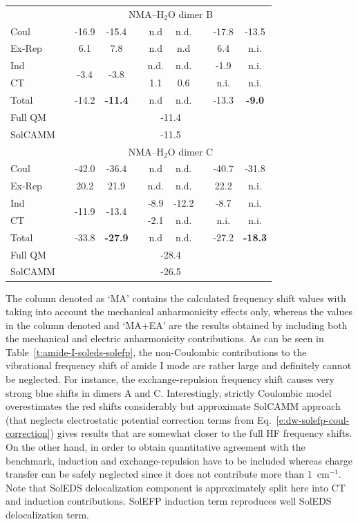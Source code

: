 \documentclass[b5paper,oneside,fleqn,11pt]{book}
\begin{document}
\begin{refsection}
\begin{table}[t!]
\begin{tabular*}{1.0\textwidth}{@{\extracolsep{\fill} } l ccccccccc }
%
 && \multicolumn{8}{c}{NMA--H$_2$O dimer B} \\
\cline{3-10}
Coul   &&  -16.9 & -15.4 && n.d   &  n.d. && -17.8 & -13.5 \\
Ex-Rep &&   6.1  &   7.8 && n.d   &  n.d  &&  6.4 &  n.i. \\
Ind    &&  \multirow{2}{*}{-3.4} & \multirow{2}{*}{-3.8} && n.d. & n.d. && -1.9 & n.i. \\
CT     &&       &       &&  1.1  &  0.6   &&   n.i.&  n.i. \\
Total  && -14.2 & \bf{-11.4} &&  n.d  &  n.d.  && -13.3 & \bf{-9.0} \\
Full QM&& \multicolumn{8}{c}{-11.4} \\
SolCAMM&& \multicolumn{8}{c}{-11.5} \\
%
 && \multicolumn{8}{c}{NMA--H$_2$O dimer C} \\
\cline{3-10}
Coul   && -42.0 & -36.4 &&   n.d  &  n.d. && -40.7 & -31.8 \\
Ex-Rep &&  20.2 &  21.9 &&   n.d. &  n.d. &&  22.2 &  n.i. \\
Ind    &&  \multirow{2}{*}{-11.9} & \multirow{2}{*}{-13.4} && -8.9 & -12.2 && -8.7 & n.i. \\
CT     &&       &       &&  -2.1  &  n.d. &&  n.i. &  n.i. \\
Total  && -33.8 & \bf{-27.9} &&   n.d  &  n.d. && -27.2 & \bf{-18.3} \\
Full QM&& \multicolumn{8}{c}{-28.4} \\
SolCAMM&& \multicolumn{8}{c}{-26.5} \\
\hline\hline
\end{tabular*}
\end{table}
%
The
column denoted as `MA' contains the calculated frequency
shift values with taking into account the mechanical anharmonicity
effects only, whereas the
values in the column denoted and `MA+EA' are the results obtained
by including both the mechanical and electric anharmonicity
contributions. As can be seen in Table~\ref{t:amide-I-soleds-solefp}, 
the non\hyp{}Coulombic contributions to the vibrational frequency shift
of amide I mode are rather large and definitely cannot be neglected.
For instance, the exchange\hyp{}repulsion frequency shift causes very
strong blue shifts in dimers A and C. Interestingly, strictly Coulombic
model
overestimates the red shifts considerably but approximate SolCAMM approach
(that neglects electrostatic potential correction terms from Eq.~\eqref{e:dw-solefp-coul-correction})
gives results that are somewhat closer to the full HF frequency shifts.
On the other hand, in order to obtain
quantitative agreement with the benchmark, induction and exchange\hyp{}repulsion
have to be included whereas charge transfer can be safely neglected since it does
not contribute more than 1~cm$^{-1}$. Note that SolEDS delocalization component
is approximately split here into CT and induction contributions. SolEFP induction
term reproduces well SolEDS delocalization term.


\end{refsection}
\end{document}
